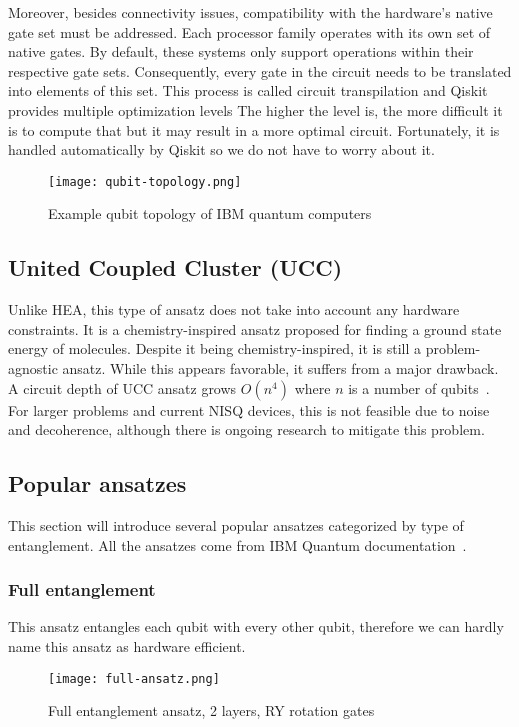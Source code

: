 Moreover, besides connectivity issues, compatibility with the hardware's native gate set must be addressed. Each processor family operates with its own set of native gates. By default, these systems only support operations within their respective gate sets. Consequently, every gate in the circuit needs to be translated into elements of this set. This process is called circuit transpilation and Qiskit provides multiple optimization levels The higher the level is, the more difficult it is to compute that but it may result in a more optimal circuit. Fortunately, it is handled automatically by Qiskit so we do not have to worry about it. 

\begin{figure}[H]
    \texttt{[image: qubit-topology.png]}
    \caption{Example qubit topology of IBM quantum computers~\cite{img:topology}}
    \label{fig:qubit_topology}
\end{figure}

\subsection{United Coupled Cluster (UCC)}
Unlike HEA, this type of ansatz does not take into account any hardware constraints. It is a chemistry-inspired ansatz proposed for finding a ground state energy of molecules. Despite it being chemistry-inspired, it is still a problem-agnostic ansatz. While this appears favorable, it suffers from a major drawback. A circuit depth of UCC ansatz grows $O(n^4)$ where $n$ is a number of qubits~\cite{ucc_ansatz}. For larger problems and current NISQ devices, this is not feasible due to noise and decoherence, although there is ongoing research to mitigate this problem.
  
\subsection{Popular ansatzes}
This section will introduce several popular ansatzes categorized by type of entanglement. All the ansatzes come from IBM Quantum documentation~\cite{twolocal}. 

\subsubsection{Full entanglement}
This ansatz entangles each qubit with every other qubit, therefore we can hardly name this ansatz as hardware efficient.
\begin{figure}[H]
    \centering
    \texttt{[image: full-ansatz.png]}
    \caption{Full entanglement ansatz, 2 layers, RY rotation gates}
\end{figure}

